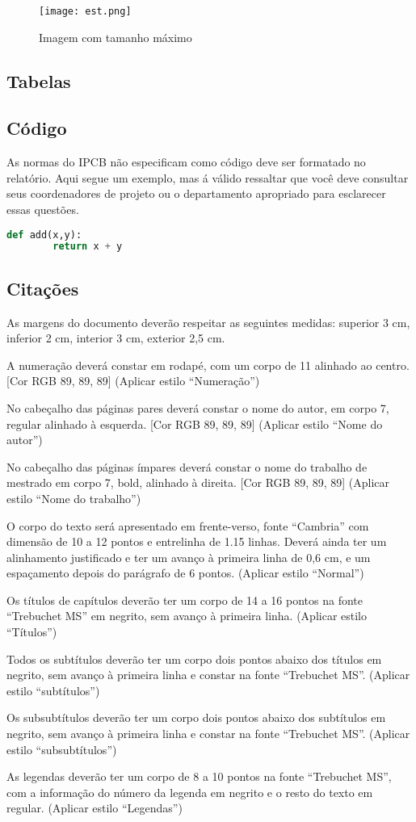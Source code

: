 \documentclass[twoside, 11pt]{article}
\begin{document}
\begin{figure}[ht]
    \texttt{[image: est.png]}
    \caption{Imagem com tamanho máximo}
\end{figure}

\subsection{Tabelas}
\subsection{Código}

As normas do IPCB não especificam como código deve ser formatado no relatório. 
Aqui segue um exemplo, mas á válido ressaltar que você deve consultar seus coordenadores de projeto
ou o departamento apropriado para esclarecer essas questões. 

\begin{lstlisting}[language=Python, caption=Exemplo de uso de código]
    def add(x,y):
        return x + y
\end{lstlisting}

\subsection{Citações}

As margens do documento deverão respeitar as seguintes medidas: superior 3 cm, inferior 2 cm, interior 3 cm, exterior 2,5 cm.

A numeração deverá constar em rodapé, com um corpo de 11 alinhado ao centro. [Cor RGB 89, 89, 89] (Aplicar estilo “Numeração”) 

No cabeçalho das páginas pares deverá constar o nome do autor, em corpo 7, regular alinhado à esquerda. [Cor RGB 89, 89, 89] (Aplicar estilo “Nome do autor”)

No cabeçalho das páginas ímpares deverá constar o nome do trabalho de mestrado em corpo 7, bold, alinhado à direita. [Cor RGB 89, 89, 89] (Aplicar estilo “Nome do trabalho”)

O corpo do texto será apresentado em frente-verso, fonte “Cambria” com dimensão de 10 a 12 pontos e entrelinha de 1.15 linhas. Deverá ainda ter um alinhamento justificado e ter um avanço à primeira linha de 0,6 cm, e um espaçamento depois do parágrafo de 6 pontos. (Aplicar estilo “Normal”)

Os títulos de capítulos deverão ter um corpo de 14 a 16 pontos na fonte “Trebuchet MS” em negrito, sem avanço à primeira linha. (Aplicar estilo “Títulos”)

Todos os subtítulos deverão ter um corpo dois pontos abaixo dos títulos em negrito, sem avanço à primeira linha e constar na fonte “Trebuchet MS”. (Aplicar estilo “subtítulos”)

Os subsubtítulos deverão ter um corpo dois pontos abaixo dos subtítulos em negrito, sem avanço à primeira linha e constar na fonte “Trebuchet MS”. (Aplicar estilo “subsubtítulos”)

As legendas deverão ter um corpo de 8 a 10 pontos na fonte “Trebuchet MS”, com a informação do número da legenda em negrito e o resto do texto em regular. (Aplicar estilo “Legendas”)
\end{document}
